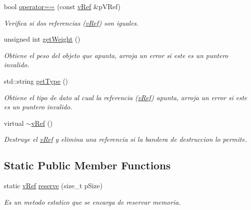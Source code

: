 \begin{DoxyCompactItemize}
bool \hyperlink{classv_ref_a67f7a5cc022f60bfe5a6d1069d97a455}{operator==} (const \hyperlink{classv_ref}{v\-Ref} \&p\-V\-Ref)
\begin{DoxyCompactList}\small\item\em Verifica si dos referencias (\hyperlink{classv_ref}{v\-Ref}) son iguales. \end{DoxyCompactList}\item 
unsigned int \hyperlink{classv_ref_a82bfa187c785c2044dde59aa8d993c6a}{get\-Weight} ()
\begin{DoxyCompactList}\small\item\em Obtiene el peso del objeto que apunta, arroja un error si este es un puntero invalido. \end{DoxyCompactList}\item 
std\-::string \hyperlink{classv_ref_a29f102a40b30f7662de769fd07f42f0c}{get\-Type} ()
\begin{DoxyCompactList}\small\item\em Obtiene el tipo de dato al cual la referencia (\hyperlink{classv_ref}{v\-Ref}) apunta, arroja un error si este es un puntero invalido. \end{DoxyCompactList}\item 
\hypertarget{classv_ref_a0c2e8271f53598dc7ba931db2b7a182d}{virtual \hyperlink{classv_ref_a0c2e8271f53598dc7ba931db2b7a182d}{$\sim$v\-Ref} ()}\label{classv_ref_a0c2e8271f53598dc7ba931db2b7a182d}

\begin{DoxyCompactList}\small\item\em Destruye el \hyperlink{classv_ref}{v\-Ref} y elimina una referencia si la bandera de destruccion lo permite. \end{DoxyCompactList}\end{DoxyCompactItemize}
\subsection*{Static Public Member Functions}
\begin{DoxyCompactItemize}
\item 
static \hyperlink{classv_ref}{v\-Ref} \hyperlink{classv_ref_a3d6e6cea5b9e5ec7ea4875f77f0c23d7}{reserve} (size\-\_\-t p\-Size)
\begin{DoxyCompactList}\small\item\em Es un metodo estatico que se encarga de reservar memoria. \end{DoxyCompactList}\end{DoxyCompactItemize}
